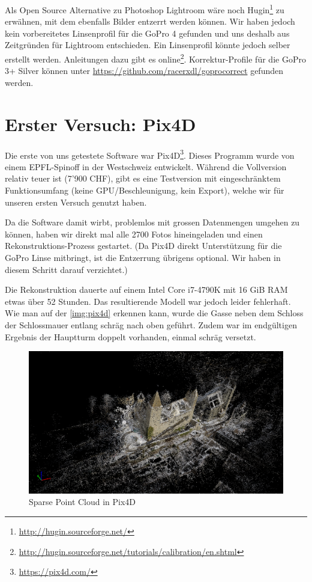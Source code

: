 Als Open Source Alternative zu Photoshop Lightroom wäre noch
Hugin\footnote{\url{http://hugin.sourceforge.net/}} zu erwähnen, mit dem
ebenfalls Bilder entzerrt werden können. Wir haben jedoch kein vorbereitetes
Linsenprofil für die GoPro 4 gefunden und uns deshalb aus Zeitgründen für
Lightroom entschieden. Ein Linsenprofil könnte jedoch selber erstellt werden.
Anleitungen dazu gibt es
online\footnote{\url{http://hugin.sourceforge.net/tutorials/calibration/en.shtml}}.
Korrektur-Profile für die GoPro 3+ Silver können unter
\url{https://github.com/racerxdl/goprocorrect} gefunden werden.


\section{Erster Versuch: Pix4D}

Die erste von uns getestete Software war
Pix4D\footnote{\url{https://pix4d.com/}}. Dieses Programm wurde von einem
EPFL-Spinoff in der Westschweiz entwickelt. Während die Vollversion relativ
teuer ist (7'900 CHF), gibt es eine Testversion mit eingeschränktem
Funktionsumfang (keine GPU\-/Beschleunigung, kein Export), welche wir für
unseren ersten Versuch genutzt haben.

Da die Software damit wirbt, problemlos mit grossen Datenmengen umgehen zu
können, haben wir direkt mal alle 2700 Fotos hineingeladen und einen
Rekonstruktions-Prozess gestartet. (Da Pix4D direkt Unterstützung für die GoPro
Linse mitbringt, ist die Entzerrung übrigens optional. Wir haben in diesem
Schritt darauf verzichtet.)

Die Rekonstruktion dauerte auf einem Intel Core i7-4790K mit 16 GiB RAM etwas
über 52 Stunden. Das resultierende Modell war jedoch leider fehlerhaft. Wie man
auf der \autoref{img:pix4d} erkennen kann, wurde die Gasse neben dem Schloss
der Schlossmauer entlang schräg nach oben geführt. Zudem war im endgültigen
Ergebnis der Hauptturm doppelt vorhanden, einmal schräg versetzt.

\begin{figure}
	\includegraphics[width=\textwidth]{images/pix4d.png}
	\caption{Sparse Point Cloud in Pix4D}
	\label{img:pix4d}
\end{figure}

